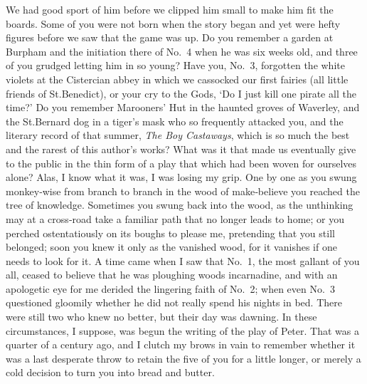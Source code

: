 We had good sport of him before we clipped him small to make him fit the boards.
Some of you were not born when the story began
and yet were hefty figures before we saw that the game was up.
Do you remember a garden at Burpham and the initiation there of No.~4 when he was six weeks old,
and three of you grudged letting him in so young?
Have you, No.~3, forgotten the white violets at the Cistercian abbey
in which we cassocked our first fairies
(all little friends of St.\@ Benedict),
or your cry to the Gods, ‘Do I just kill one pirate all the time?’
Do you remember Marooners’ Hut in the haunted groves of Waverley,
and the St.\@ Bernard dog in a tiger’s mask who so frequently attacked you,
and the literary record of that summer, \emph{The Boy Castaways},
which is so much the best and the rarest of this author’s works?
What was it that made us eventually give to the public in the thin form of a play
that which had been woven for ourselves alone?
Alas, I know what it was, I was losing my grip.
One by one as you swung monkey‐wise from branch to branch in the wood of make‐believe
you reached the tree of knowledge.
Sometimes you swung back into the wood,
as the unthinking may at a cross‐road take a familiar path that no longer leads to home;
or you perched ostentatiously on its boughs to please me,
pretending that you still belonged;
soon you knew it only as the vanished wood,
for it vanishes if one needs to look for it.
A time came when I saw that No.~1, the most gallant of you all,
ceased to believe that he was ploughing woods incarnadine,
and with an apologetic eye for me derided the lingering faith of No.~2;
when even No.~3 questioned gloomily whether he did not really spend his nights in bed.
There were still two who knew no better, but their day was dawning.
In these circumstances, I suppose, was begun the writing of the play of Peter.
That was a quarter of a century ago,
and I clutch my brows in vain to remember
whether it was a last desperate throw to retain the five of you for a little longer,
or merely a cold decision to turn you into bread and butter.

